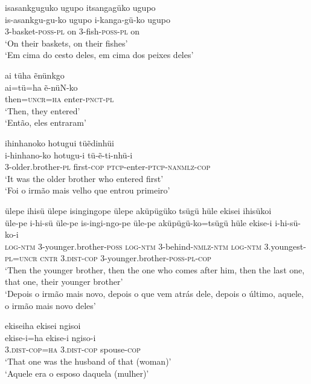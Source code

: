 \documentclass[output=paper,
modfonts,nonflat
]{langsci/langscibook}
\begin{document}
\ea isasankguguko ugupo itsangagüko ugupo{\footnotemark} \\[.3em]
\gll is-asankgu-gu-ko	ugupo	i-kanga-gü-ko		ugupo \\
3-basket-\textsc{poss-pl} 	on 	3-fish-\textsc{poss-pl} 	on \\
\glt ‘On their baskets, on their fishes’ \\
‘Em cima do cesto deles, em cima dos peixes deles’ \\ 
\z

\ea ai tüha ẽnünkgo \\[.3em]
\gll ai=tü=ha	ẽ-nüN-ko \\
then=\textsc{uncr=ha}	enter-\textsc{pnct-pl} \\
\glt ‘Then, they entered’ \\
‘Então, eles entraram’ \\
\z

 \largerpage
\ea ihinhanoko hotugui tüẽdinhüi \\[.3em]
\gll i-hinhano-ko		hotugu-i 	tü-ẽ-ti-nhü-i \\
3-older.brother\textsc{-pl} 	first\textsc{-cop} 	\textsc{ptcp}-enter\textsc{-ptcp-nanmlz-cop} \\
\glt ‘It was the older brother who entered first’ \\
‘Foi o irmão mais velho que entrou primeiro’ \\
\z

\ea ülepe ihisü ülepe isingingope ülepe aküpügüko tsügü hüle ekisei ihisükoi \\[.3em]
\gll üle-pe	i-hi-sü	üle-pe is-ingi-ngo-pe üle-pe	aküpügü-ko=tsügü	hüle	ekise-i i-hi-sü-ko-i \\
\textsc{log-ntm} 	3-younger.brother-\textsc{poss} 	\textsc{log-ntm} 	3-behind-\textsc{nmlz-ntm} \textsc{log-ntm} 3.youngest-\textsc{pl=uncr} \textsc{cntr} 3.\textsc{dist-cop} 3-younger.brother-\textsc{poss-pl-cop} \\
\glt ‘Then the younger brother, then the one who comes after him, then the last one, that one, their younger brother’ \\
‘Depois o irmão mais novo, depois o que vem atrás dele, depois o último, aquele, o irmão mais novo deles’ \\
\z

\ea ekiseiha ekisei ngisoi \\[.3em]
\gll ekise-i=ha		ekise-i	ngiso-i \\
\textsc{3.dist-cop=ha} 	\textsc{3.dist-cop} 	spouse\textsc{-cop} \\
\glt ‘That one was the husband of that (woman)’ \\
‘Aquele era o esposo daquela (mulher)’ \\
\z
\end{document}
